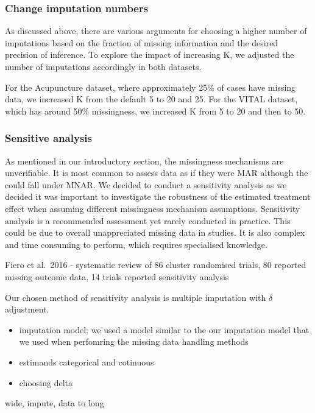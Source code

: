 \documentclass{article}
\begin{document}
\subsubsection{Change imputation
numbers}\label{change-imputation-numbers}

As discussed above, there are various arguments for choosing a higher
number of imputations based on the fraction of missing information and
the desired precision of inference. To explore the impact of increasing
K, we adjusted the number of imputations accordingly in both datasets.

For the Acupuncture dataset, where approximately 25\% of cases have
missing data, we increased K from the default 5 to 20 and 25. For the
VITAL dataset, which has around 50\% missingness, we increased K from 5
to 20 and then to 50.

\subsubsection{Sensitive analysis}\label{sensitive-analysis}

As mentioned in our introductory section, the missingness mechanisms are
unverifiable. It is most common to assess data as if they were MAR
although the could fall under MNAR. We decided to conduct a sensitivity
analysis as we decided it was important to investigate the robustness of
the estimated treatment effect when assuming different missingness
mechanism assumptions. Sensitivity analysis is a recommended assessment
yet rarely conducted in practice. This could be due to overall
unappreciated missing data in studies. It is also complex and time
consuming to perform, which requires specialised knowledge.

Fiero et al.~2016 - systematic review of 86 cluster randomised trials,
80 reported missing outcome data, 14 trials reported sensitivity
analysis

Our chosen method of sensitivity analysis is multiple imputation with
\(\delta\) adjustment.

\begin{itemize}
\item
  imputation model; we used a model similar to the our imputation model
  that we used when perfomring the missing data handling methods
\item
  estimands categorical and cotinuous
\item
  choosing delta
\end{itemize}

wide, impute, data to long
\end{document}
